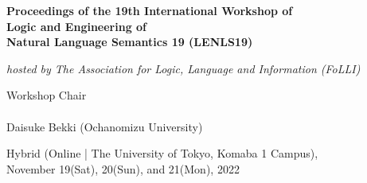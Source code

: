 \documentclass[12pt]{jarticle}
\begin{document}
\pagestyle{empty}

\vspace*{1cm}
\begin{Large}
\begin{center}
{\bf Proceedings of the 19th International Workshop of \\
     Logic and Engineering of \\Natural Language Semantics 19 (LENLS19)}
\end{center}
\end{Large}
\vspace*{1cm}
\begin{Large}
\begin{center}
{\em hosted by The Association for Logic, Language and Information (FoLLI)}
\end{center}
\end{Large}
\begin{large}
\vspace*{1cm}
\begin{center}
Workshop Chair\\ $\;$\\
Daisuke Bekki (Ochanomizu University)
\end{center}
\end{large}
\vspace*{3cm}
\begin{center}
\centerline{
\hspace*{30pt}
}
\end{center}
\vspace*{1cm}
\begin{large}
\begin{center}
Hybrid (Online | The University of Tokyo, Komaba 1 Campus), \\
November 19(Sat), 20(Sun), and 21(Mon), 2022
\end{center}
\end{large}
\vfill
\end{document}
